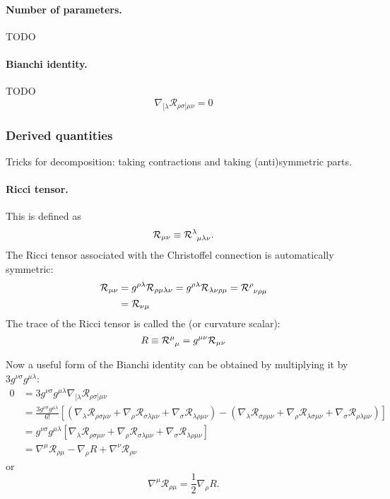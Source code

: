 \paragraph{Number of parameters.} TODO
\paragraph{Bianchi identity.} TODO
\[ \nabla_{[\lambda}\mathcal{R}_{\rho\sigma]\mu\nu} = 0 \]

\subsubsection{Derived quantities}
Tricks for decomposition: taking contractions and taking (anti)symmetric parts.

\paragraph{Ricci tensor.} This  is defined as
\[ \mathcal{R}_{\mu\nu} \equiv \tensor{\mathcal{R}}{^\lambda_{\mu\lambda\nu}}. \]
The Ricci tensor associated with the Christoffel connection is automatically symmetric:
\begin{align}
\mathcal{R}_{\mu\nu} &= g^{\rho\lambda}\mathcal{R}_{\rho\mu\lambda\nu} = g^{\rho\lambda}\mathcal{R}_{\lambda\nu\rho\mu} = \tensor{\mathcal{R}}{^\rho_{\nu\rho\mu}} \\
&= \mathcal{R}_{\nu\mu}
\end{align}
The trace of the Ricci tensor is called the  (or curvature scalar):
\[ R \equiv \tensor{\mathcal{R}}{^\mu_\mu} = g^{\mu\nu}\mathcal{R}_{\mu\nu} \]

Now a useful form of the Bianchi identity can be obtained by multiplying it by $3g^{\nu\sigma}g^{\mu\lambda}$:
\begin{align}
0 &= 3g^{\nu\sigma}g^{\mu\lambda}\nabla_{[\lambda}\mathcal{R}_{\rho\sigma]\mu\nu} \\
&= \frac{3g^{\nu\sigma}g^{\mu\lambda}}{6!}\left[\left(\nabla_{\lambda}\mathcal{R}_{\rho\sigma\mu\nu} + \nabla_{\rho}\mathcal{R}_{\sigma\lambda\mu\nu} + \nabla_{\sigma}\mathcal{R}_{\lambda\rho\mu\nu}\right) - \left(\nabla_{\lambda}\mathcal{R}_{\sigma\rho\mu\nu} + \nabla_{\rho}\mathcal{R}_{\lambda\sigma\mu\nu} + \nabla_{\sigma}\mathcal{R}_{\rho\lambda\mu\nu}\right)\right] \\
&= g^{\nu\sigma}g^{\mu\lambda}\left[\nabla_{\lambda}\mathcal{R}_{\rho\sigma\mu\nu} + \nabla_{\rho}\mathcal{R}_{\sigma\lambda\mu\nu} + \nabla_{\sigma}\mathcal{R}_{\lambda\rho\mu\nu}\right] \\
&= \nabla^\mu\mathcal{R}_{\rho\mu} - \nabla_\rho R + \nabla^\nu\mathcal{R}_{\rho\nu}
\end{align}
or
\[ \boxed{\nabla^\mu\mathcal{R}_{\rho\mu} = \frac{1}{2}\nabla_\rho R.} \]



